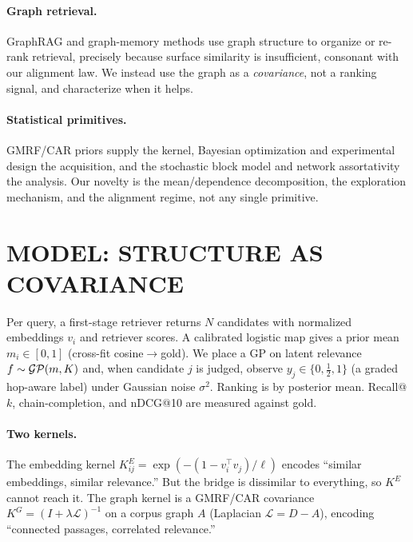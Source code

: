 \documentclass[twoside]{article}
\theoremstyle{plain}
\theoremstyle{definition}
\begin{document}
\paragraph{Graph retrieval.} GraphRAG \citep{edge2024graphrag} and graph-memory methods
\citep{gutierrez2024hipporag} use graph structure to organize or re-rank retrieval, precisely because surface
similarity is insufficient, consonant with our alignment law. We instead use the graph as a \emph{covariance},
not a ranking signal, and characterize when it helps.
\paragraph{Statistical primitives.} GMRF/CAR priors \citep{rue2005gmrf,besag1974car} supply the kernel, Bayesian
optimization and experimental design \citep{srinivas2010gpucb,chaloner1995bed} the acquisition, and the stochastic
block model \citep{holland1983sbm} and network assortativity \citep{newman2003assortativity} the analysis. Our
novelty is the mean/dependence decomposition, the exploration mechanism, and the alignment regime, not any single
primitive.

\section{MODEL: STRUCTURE AS COVARIANCE}\label{sec:model}
Per query, a first-stage retriever returns $N$ candidates with normalized embeddings $v_i$ and retriever scores.
A calibrated logistic map gives a prior mean $m_i\in[0,1]$ (cross-fit cosine$\to$gold). We place a GP on latent
relevance $f\sim\mathcal{GP}(m,K)$ and, when candidate $j$ is judged, observe $y_j\in\{0,\tfrac12,1\}$ (a graded hop-aware
label) under Gaussian noise $\sigma^2$. Ranking is by posterior mean. Recall@$k$, chain-completion, and nDCG@10
are measured against gold.

\paragraph{Two kernels.} The embedding kernel $K^E_{ij}=\exp(-(1-v_i^\top v_j)/\ell)$ encodes ``similar
embeddings, similar relevance.'' But the bridge is dissimilar to everything, so $K^E$ cannot reach it. The graph
kernel is a GMRF/CAR covariance $K^G=(I+\lambda \mathcal L)^{-1}$ on a corpus graph $A$ (Laplacian
$\mathcal L=D-A$), encoding ``connected passages, correlated relevance.''
\end{document}
